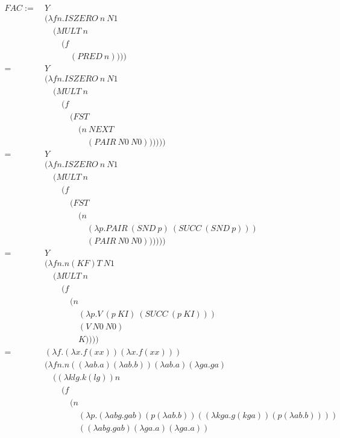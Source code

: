 \documentclass[11pt]{article}
\begin{document}
\begingroup
\allowdisplaybreaks
\begin{align*}
	FAC:=\ &Y\\
	&(\lambda fn.ISZERO\ n\ N1\\
	&\quad(MULT\ n\\
	&\quad\quad(f\\
	&\quad\quad\quad(PRED\ n))))\\
	=\ &Y\\
	&(\lambda fn.ISZERO\ n\ N1\\
	&\quad(MULT\ n\\
	&\quad\quad(f\\
	&\quad\quad\quad(FST\\
	&\quad\quad\quad\quad(n\ NEXT\\
	&\quad\quad\quad\quad\quad(PAIR\ N0\ N0))))))\\
	=\ &Y\\
	&(\lambda fn.ISZERO\ n\ N1\\
	&\quad(MULT\ n\\
	&\quad\quad(f\\
	&\quad\quad\quad(FST\\
	&\quad\quad\quad\quad(n\\
	&\quad\quad\quad\quad\quad(\lambda p.PAIR\ (SND\ p)\ (SUCC\ (SND\ p)))\\
	&\quad\quad\quad\quad\quad(PAIR\ N0\ N0))))))\\
	=\ &Y\\
	&(\lambda fn.n(KF)T\ N1\\
	&\quad(MULT\ n\\
	&\quad\quad(f\\
	&\quad\quad\quad(n\\
	&\quad\quad\quad\quad(\lambda p.V\ (p\ KI)\ (SUCC\ (p\ KI)))\\
	&\quad\quad\quad\quad(V\ N0\ N0)\\
	&\quad\quad\quad\quad K))))\\
	=\ &(\lambda f.(\lambda x.f(xx))(\lambda x.f(xx)))\\
	&(\lambda fn.n((\lambda ab.a)(\lambda ab.b))(\lambda ab.a)(\lambda ga.ga)\\
	&\quad((\lambda klg.k(lg))n\\
	&\quad\quad(f\\
	&\quad\quad\quad(n\\
	&\quad\quad\quad\quad(\lambda p.(\lambda abg.gab)(p(\lambda ab.b))((\lambda kga.g(kga))(p(\lambda ab.b))))\\
	&\quad\quad\quad\quad((\lambda abg.gab)(\lambda ga.a)(\lambda ga.a))\\

\end{align*}
\end{document}
